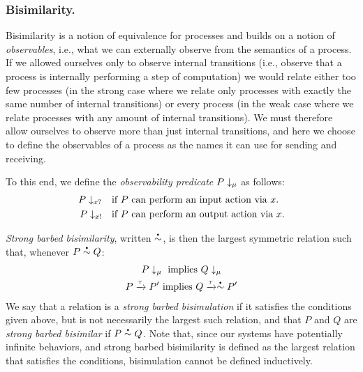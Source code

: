 
\subsubsection{Bisimilarity.}
Bisimilarity is a notion of equivalence for processes and
builds on a notion of \emph{observables}, i.e., what we can externally
observe from the semantics of a process. If we allowed ourselves only to observe
internal transitions (i.e., observe that a process is internally
performing a step of computation) we would relate either too few
processes (in the strong case where we relate only processes with
exactly the same number of internal transitions) or every process (in
the weak case where we relate processes with any amount of internal
transitions).  We must therefore allow ourselves to observe more than
just internal transitions, and here we choose to define the observables
of a process as the names it can use for sending and receiving.

To this end, we define the \emph{observability predicate}
\( P\downarrow_{\mu} \) as follows:
\begin{align*}
  P\downarrow_{x?}  &\quad \textrm{if \( P \) can perform an input action via \( x \).} \\
  P\downarrow_{x!} &\quad \textrm{if \( P \) can perform an output action via \( x \).}
\end{align*}

\emph{Strong barbed bisimilarity}, written \( \sbbisim{}{} \), is then the largest symmetric relation such that, whenever \( \sbbisim{P}{Q} \):
\begin{gather}
  \observable{P}{\mu}~\textrm{implies}~\observable{Q}{\mu}\label{eq:bisim1} \\
  \transition{P}{\Atau}{P'}~\textrm{implies}~\transition{Q}{\Atau}{\sbbisim{}{} P'}\label{eq:bisim2}
\end{gather}
We say that a relation is a \emph{strong barbed bisimulation} if it satisfies the conditions given above, but is not necessarily the largest such relation, and that \( P \) and \( Q \) are \emph{strong barbed bisimilar} if \( \sbbisim{P}{Q} \).
Note that, since our systems have potentially infinite behaviors, and strong barbed bisimilarity is defined as the largest relation that satisfies the conditions, bisimulation cannot be defined inductively.

